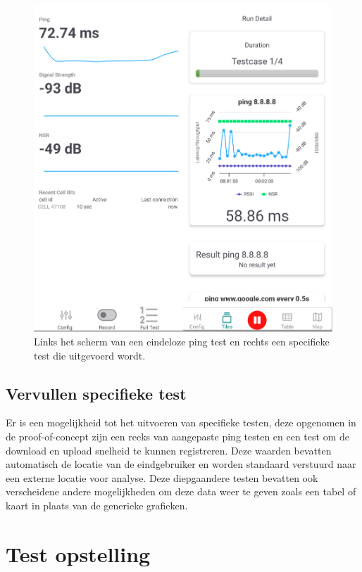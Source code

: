\begin{figure}
    \includegraphics[width=1\linewidth]{graphics/continuousspecificmerge}
    \caption[Links het scherm van een eindeloze ping test en rechts een specifieke test die uitgevoerd wordt.]{Links het scherm van een eindeloze ping test en rechts een specifieke test die uitgevoerd wordt.}
    \label{fig:continuousandspecific}
\end{figure}

\subsection{Vervullen specifieke test}

Er is een mogelijkheid tot het uitvoeren van specifieke testen, deze opgenomen in de proof-of-concept zijn een reeks van aangepaste ping testen en een test om de download en upload snelheid te kunnen registreren. Deze waarden bevatten automatisch de locatie van de eindgebruiker en worden standaard verstuurd naar een externe locatie voor analyse. Deze diepgaandere testen bevatten ook verscheidene andere mogelijkheden om deze data weer te geven zoals een tabel of kaart in plaats van de generieke grafieken.

\section{Test opstelling}


